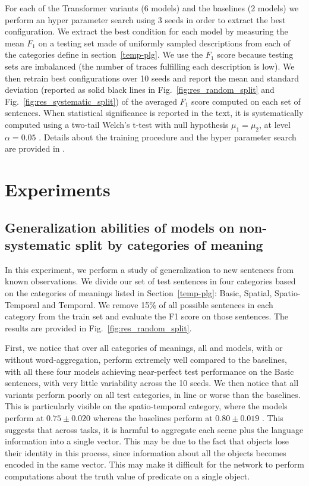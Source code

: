 For each of the Transformer variants (6 models) and the \lstm baselines (2 models) we perform an hyper parameter search using 3 seeds in order to extract the best configuration. We extract the best condition for each model by measuring the mean $F_1$ on a testing set made of uniformly sampled descriptions from each of the categories define in section~\ref{temp-plg}. We use the $F_1$ score because testing sets are imbalanced (the number of traces fulfilling each description is low). We then retrain best configurations over 10 seeds and report the mean and standard deviation (reported as solid black lines in Fig.~\ref{fig:res_random_split} and Fig.~\ref{fig:res_systematic_split}) of the averaged $F_1$ score computed on each set of sentences. When statistical significance is reported in the text, it is systematically computed using a two-tail Welch’s t-test with null hypothesis $\mu_1=\mu_2$, at level $\alpha= 0.05$ \cite{colas2019hitchhikers}. 
Details about the training procedure and the hyper parameter search are provided in .

\section{Experiments}

\subsection{Generalization abilities of models on non-systematic split by categories of meaning}\label{rand_split}

In this experiment, we perform a study of generalization to new sentences from known observations. We divide our set of test sentences in four categories based on the categories of meanings listed in Section~\ref{temp-plg}: Basic, Spatial, Spatio-Temporal and Temporal. We remove 15\% of all possible sentences in each category from the train set and evaluate the F1 score on those sentences. The results are provided in Fig.~\ref{fig:res_random_split}.

First, we notice that over all categories of meanings, all \utm and \ttm models, with or without word-aggregation, perform extremely well compared to the \lstm baselines, with all these four models achieving near-perfect test performance on the Basic sentences, with very little variability across the 10 seeds. We then notice that all \stm variants perform poorly on all test categories, in line or worse than the baselines. This is particularly visible on the spatio-temporal category, where the \stm models perform at $0.75\pm 0.020$  whereas the baselines perform at $0.80\pm 0.019$ . This suggests that across tasks, it is harmful to aggregate each scene plus the language information into a single vector. This may be due to the fact that objects lose their identity in this process, since information about all the objects becomes encoded in the same vector. This may make it difficult for the network to perform computations about the truth value of predicate on a single object. 

